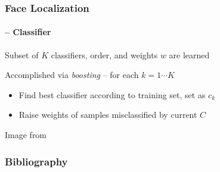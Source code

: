 \documentclass[xetex,professionalfont]{beamer}
\begin{document}

\begin{frame}
\frametitle{Face Localization}
\framesubtitle{\cite{viola2001} -- Classifier}

Subset of $K$ classifiers, order, and weights $w$ are learned

\bigskip
Accomplished via \emph{boosting} -- for each $k=1\cdots K$
\begin{itemize}
    \item Find best classifier according to training set, set as $c_k$ %
    \item Raise weights of samples misclassified by current $C$
\end{itemize}

\bigskip
\begin{center}
    {\centering Image from \cite{szeliski2010}}
\end{center}

\end{frame}


\begin{frame}[allowframebreaks=0.8]
\frametitle{Bibliography}

\printbibliography

\end{frame}
\end{document}
